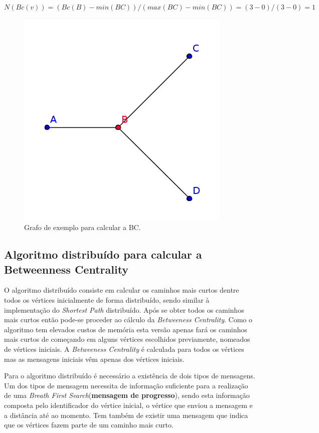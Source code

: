 \begin{math}
N(Bc(v)) =  (Bc(B) - min(BC))/(max(BC) - min(BC)) = (3 - 0) / ( 3 - 0 )=1  
\end{math}


\begin{figure}
\center
\includegraphics[scale=0.5]{bcexample}
\caption{Grafo de exemplo para calcular a BC.}\label{fig:bcexample}
\end{figure}
\subsection{Algoritmo distribuído para calcular a Betweenness Centrality}
O algoritmo distribuído consiste em calcular os caminhos mais curtos dentre todos os vértices inicialmente de forma distribuído, sendo similar à implementação do 
\textit{Shortest Path} distribuído. Após se obter todos os caminhos mais curtos 
então pode-se proceder ao cálculo da \textit{Betweeness Centrality}. Como o algoritmo tem elevados custos de memória esta versão apenas fará os caminhos mais curtos de começando em alguns vértices escolhidos previamente, nomeados de vértices iniciais. A \textit{Betweeness Centrality} é calculada para todos os vértices mas as mensagens iniciais vêm apenas dos vértices iniciais.
 
Para o algoritmo distribuído é necessário a existência de dois tipos de 
mensagens. Um dos tipos de mensagem necessita de informação suficiente para a realização de uma \textit{Breath First Search}(\textbf{mensagem de progresso}), sendo esta 
informação composta pelo identificador do vértice inicial, o vértice que enviou a mensagem e a distância 
até ao momento. Tem também de existir 
uma mensagem que indica que os vértices fazem parte de um caminho mais curto. 

